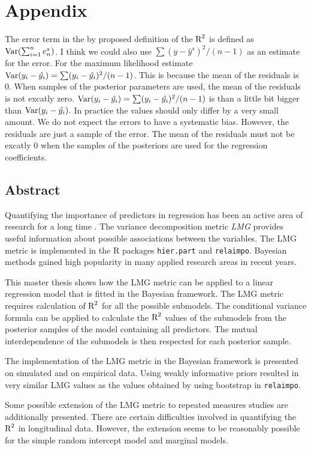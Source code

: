 \documentclass[11pt,a4paper,twoside]{book}
\begin{document}






\chapter{Appendix}

The error term in the by \cite{Gelman2017} proposed definition of the $\text{R}^2$ is defined as $\operatorname{Var}(\sum_{i=1}^{n}e^s_{n})$. I think we could also use $ \sum(y - \hat{y}^s)^2/(n-1) $ as an estimate for the error. For the maximum likelihood estimate $\operatorname{Var}(y_{i} - \hat{y_{i}}) = \sum (y_{i} - \hat{y_{i}})^2/ (n-1) $. This is because the mean of the residuals is 0. When  samples of the posterior parameters are used, the mean of the residuals is not excatly zero. $\operatorname{Var}(y_{i} - \hat{y_{i}}) = \sum (y_{i} - \hat{y_{i}})^2/ (n-1) $ is than a little bit bigger than $\operatorname{Var}(y_{i} - \hat{y_{i}}). $ In practice the values should only differ by a very small amount. We do not expect the errors to have a systematic bias. However, the residuals are just a sample of the error. The mean of the residuals must not be excatly 0 when the samples of the posteriors are used for the regression coefficients.   

\section{Abstract}

Quantifying the importance of predictors in regression has been an active area of research for a long time \citep{Gromping2015}. The variance decomposition metric \textit{LMG} provides useful information about possible associations between the variables. The LMG metric is implemented in the R packages \texttt{hier.part} and \texttt{relaimpo}. Bayesian methods gained high popularity in many applied research areas in recent years.  

This master thesis shows how the LMG metric can be applied to a linear regression model that is fitted in the Bayesian framework. The LMG metric requires calculation of $\text{R}^2$ for all the possible submodels. The conditional variance formula can be applied to calculate the $\text{R}^2$ values of the submodels from the posterior samples of the model containing all predictors. The mutual interdependence of the submodels is then respected for each posterior sample.

The implementation of the LMG metric in the Bayesian framework is presented on simulated and on empirical data. Using weakly informative priors resulted in very similar LMG values as the values obtained by using bootstrap in \texttt{relaimpo}. 

Some possible extension of the LMG metric to repeated measures studies are additionally presented. There are certain difficulties involved in quantifying the $\text{R}^2$ in longitudinal data. However,  the extension seems to be reasonably possible for the simple random intercept model and marginal models.  





 

\end{document}
